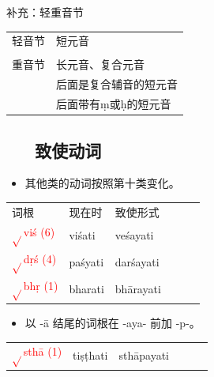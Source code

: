 \documentclass[17pt]{beamer}
\newcommand{\verbroot}[1]{\textcolor{red}{$\sqrt{}$#1}}
\newcommand{\fullpada}[1]{\textcolor{OliveGreen}{#1}}
\begin{document}
\begin{frame}{补充：轻重音节}
  \centering
  \begin{NiceTabular}{@{}ll@{}} %
    轻音节 &  短元音 \\
    \\
    重音节 & 长元音、复合元音  \\
     & 后面是复合辅音的短元音 \\
     & 后面带有ṃ或ḥ的短元音 \\
  \end{NiceTabular}
\end{frame}

\subsection{~~~致使动词}
\begin{frame}{\insertsubsection}
  \begin{itemize}
    \item
      其他类的动词按照第十类变化。    
  \end{itemize}
  \centering
  \begin{tabular}{@{}llllll@{}} %
      词根 & 现在时 & 致使形式  \\
      \verbroot{viś (6)} & \fullpada{viśati} & \fullpada{veśayati} \\
      \verbroot{dṛś (4)} & \fullpada{paśyati} & \fullpada{darśayati} \\
      \verbroot{bhṛ (1)} & \fullpada{bharati} & \fullpada{bhārayati} \\
    \end{tabular}
  \begin{itemize}
    \item
      以 \nobreakdash-ā 结尾的词根在 \nobreakdash-aya\nobreakdash- 前加 \nobreakdash-p\nobreakdash-。  
  \end{itemize}
  \begin{tabular}{@{}llllll@{}} %

      \verbroot{sthā (1)} & \fullpada{tiṣṭhati} & \fullpada{sthāpayati} \\
    \end{tabular}
\end{frame}
\end{document}
